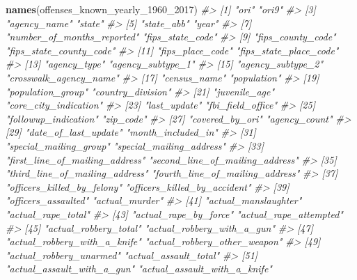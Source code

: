 \documentclass[
  12pt,
]{book}
\newenvironment{Shaded}{\begin{snugshade}}{\end{snugshade}}
\newcommand{\CommentTok}[1]{\textcolor[rgb]{0.56,0.35,0.01}{\textit{#1}}}
\newcommand{\DecValTok}[1]{\textcolor[rgb]{0.00,0.00,0.81}{#1}}
\newcommand{\KeywordTok}[1]{\textcolor[rgb]{0.13,0.29,0.53}{\textbf{#1}}}
\newcommand{\NormalTok}[1]{#1}
\begin{document}
\begin{Shaded}
\begin{Highlighting}[]
\KeywordTok{names}\NormalTok{(offenses\_known\_yearly\_}\DecValTok{1960}\NormalTok{\_}\DecValTok{2017}\NormalTok{)}
\CommentTok{\#>   [1] "ori"                            "ori9"                          }
\CommentTok{\#>   [3] "agency\_name"                    "state"                         }
\CommentTok{\#>   [5] "state\_abb"                      "year"                          }
\CommentTok{\#>   [7] "number\_of\_months\_reported"      "fips\_state\_code"               }
\CommentTok{\#>   [9] "fips\_county\_code"               "fips\_state\_county\_code"        }
\CommentTok{\#>  [11] "fips\_place\_code"                "fips\_state\_place\_code"         }
\CommentTok{\#>  [13] "agency\_type"                    "agency\_subtype\_1"              }
\CommentTok{\#>  [15] "agency\_subtype\_2"               "crosswalk\_agency\_name"         }
\CommentTok{\#>  [17] "census\_name"                    "population"                    }
\CommentTok{\#>  [19] "population\_group"               "country\_division"              }
\CommentTok{\#>  [21] "juvenile\_age"                   "core\_city\_indication"          }
\CommentTok{\#>  [23] "last\_update"                    "fbi\_field\_office"              }
\CommentTok{\#>  [25] "followup\_indication"            "zip\_code"                      }
\CommentTok{\#>  [27] "covered\_by\_ori"                 "agency\_count"                  }
\CommentTok{\#>  [29] "date\_of\_last\_update"            "month\_included\_in"             }
\CommentTok{\#>  [31] "special\_mailing\_group"          "special\_mailing\_address"       }
\CommentTok{\#>  [33] "first\_line\_of\_mailing\_address"  "second\_line\_of\_mailing\_address"}
\CommentTok{\#>  [35] "third\_line\_of\_mailing\_address"  "fourth\_line\_of\_mailing\_address"}
\CommentTok{\#>  [37] "officers\_killed\_by\_felony"      "officers\_killed\_by\_accident"   }
\CommentTok{\#>  [39] "officers\_assaulted"             "actual\_murder"                 }
\CommentTok{\#>  [41] "actual\_manslaughter"            "actual\_rape\_total"             }
\CommentTok{\#>  [43] "actual\_rape\_by\_force"           "actual\_rape\_attempted"         }
\CommentTok{\#>  [45] "actual\_robbery\_total"           "actual\_robbery\_with\_a\_gun"     }
\CommentTok{\#>  [47] "actual\_robbery\_with\_a\_knife"    "actual\_robbery\_other\_weapon"   }
\CommentTok{\#>  [49] "actual\_robbery\_unarmed"         "actual\_assault\_total"          }
\CommentTok{\#>  [51] "actual\_assault\_with\_a\_gun"      "actual\_assault\_with\_a\_knife"   }

\end{Highlighting}
\end{Shaded}
\end{document}
